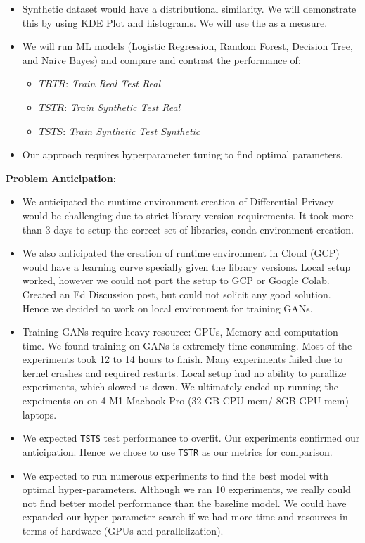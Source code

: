 \documentclass[10pt,twocolumn,letterpaper]{article}
\begin{document}
\begin{itemize}
    \item Synthetic dataset would have a distributional similarity. We will demonstrate this by using KDE Plot and histograms. We will use the  as a measure.\cite{5}

    \item We will run ML models (Logistic Regression, Random Forest, Decision Tree, and Naive Bayes) and compare and contrast the performance of:
    \begin{itemize}
        \item $TRTR$: \textit{Train Real Test Real}
        \item $TSTR$: \textit{Train Synthetic Test Real}
        \item $TSTS$: \textit{Train Synthetic Test Synthetic}
    \end{itemize}

    \item Our approach requires hyperparameter tuning to find optimal parameters.
\end{itemize}

    \item \textbf{Problem Anticipation}:
    \begin{itemize}
        \item We anticipated the runtime environment creation of Differential Privacy would be challenging due to strict library version requirements. It took more than 3 days to setup the correct set of libraries, conda environment creation.
        \item We also anticipated the creation of runtime environment in Cloud (GCP) would have a learning curve specially given the library versions. Local setup worked, however we could not port the setup to GCP or Google Colab. Created an Ed Discussion post, but could not solicit any good solution. Hence we decided to work on local environment for training GANs.
        \item Training GANs require heavy resource: GPUs, Memory and computation time. We found training on GANs is extremely time consuming. Most of the experiments took 12 to 14 hours to finish. Many experiments failed due to kernel crashes and required restarts. Local setup had no ability to parallize experiments, which slowed us down. We ultimately ended up running the expeiments on on 4 M1 Macbook Pro (32 GB CPU mem/ 8GB GPU mem) laptops.
        \item We expected \verb'TSTS' test performance to overfit. Our experiments confirmed our anticipation. Hence we chose to use \verb'TSTR' as our metrics for comparison.
        \item We expected to run numerous experiments to find the best model with optimal hyper-parameters. Although we ran 10 experiments, we really could not find better model performance than the baseline model. We could have expanded our hyper-parameter search if we had more time and resources in terms of hardware (GPUs and parallelization).
    \end{itemize}
\end{document}
